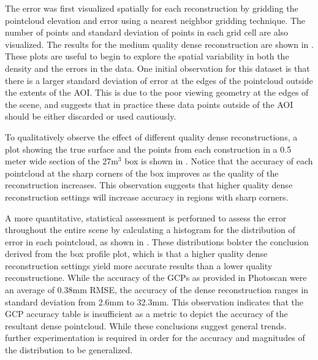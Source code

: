 The error was first visualized spatially for each reconstruction by gridding the pointcloud elevation and error using a nearest neighbor gridding technique.  The number of points and standard deviation of points in each grid cell are also visualized.  The results for the medium quality dense reconstruction are shown in .  These plots are useful to begin to explore the spatial variability in both the density and the errors in the data.  One initial observation for this dataset is that there is a larger standard deviation of error at the edges of the pointcloud outside the extents of the AOI.  This is due to the poor viewing geometry at the edges of the scene, and suggests that in practice these data points outside of the AOI should be either discarded or used cautiously.



To qualitatively observe the effect of different quality dense reconstructions, a plot showing the true surface and the points from each construction in a 0.5 meter wide section of the 27m$^3$ box is shown in .  Notice that the accuracy of each pointcloud at the sharp corners of the box improves as the quality of the reconstruction increases.  This observation suggests that higher quality dense reconstruction settings will increase accuracy in regions with sharp corners.



A more quantitative, statistical assessment is performed to assess the error throughout the entire scene by calculating a histogram for the distribution of error in each pointcloud, as shown in . These distributions bolster the conclusion derived from the box profile plot, which is that a higher quality dense reconstruction settings yield more accurate results than a lower quality reconstructione.  While the accuracy of the GCPs as provided in Photoscan were an average of 0.38mm RMSE, the accuracy of the dense reconstruction ranges in standard deviation from 2.6mm to 32.3mm.  This observation indicates that the GCP accuracy table is insufficient as a metric to depict the accuracy of the resultant dense pointcloud.  While these conclusions suggest general trends. further experimentation is required in order for the accuracy and magnitudes of the distribution to be generalized.




	
